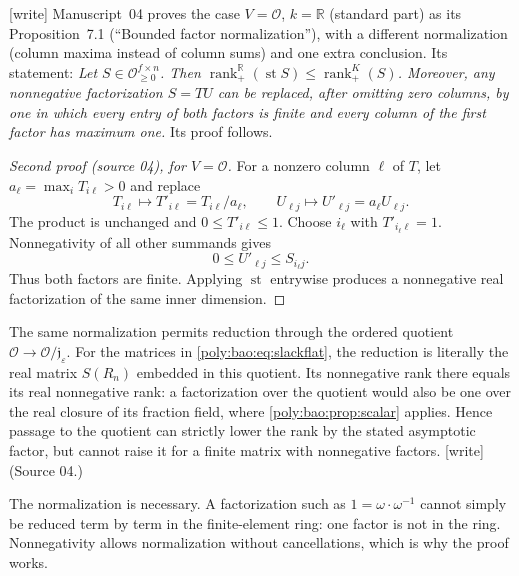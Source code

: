 \documentclass[11pt,a4paper]{article}
\numberwithin{equation}{section}
\theoremstyle{plain}
\newcommand{\wtag}{\textup{[write]}}%
\newcommand{\R}{\mathbb R}
\newcommand{\eps}{\varepsilon}
\newcommand{\st}{\operatorname{st}}
\newcommand{\OO}{\mathcal O}
\newcommand{\nrk}{\operatorname{rank}_{+}}
\newcommand{\JJ}{\mathfrak j}
\begin{document}
\begin{remark}\label{poly:bao:rem:normalization}
\wtag{} Manuscript~04 proves the case $V=\OO$, $k=\R$ (standard part) as
its Proposition~7.1 (``Bounded factor normalization''), with a different
normalization (column maxima instead of column sums) and one extra
conclusion. Its statement: \emph{Let $S\in\OO_{\geq0}^{f\times n}$. Then
$\nrk^{\R}(\st S)\leq\nrk^K(S)$. Moreover, any nonnegative factorization
$S=TU$ can be replaced, after omitting zero columns, by one in which every
entry of both factors is finite and every column of the first factor has
maximum one.} Its proof follows.
\end{remark}
\begin{proof}[Second proof (source 04), for $V=\OO$]
For a nonzero column $\ell$ of $T$, let $a_\ell=\max_iT_{i\ell}>0$ and
replace
\[
 T_{i\ell}\longmapsto T'_{i\ell}=T_{i\ell}/a_\ell,
 \qquad
 U_{\ell j}\longmapsto U'_{\ell j}=a_\ell U_{\ell j}.
\]
The product is unchanged and $0\leq T'_{i\ell}\leq1$. Choose $i_\ell$
with $T'_{i_\ell\ell}=1$. Nonnegativity of all other summands gives
\[
 0\leq U'_{\ell j}\leq S_{i_\ell j}.
\]
Thus both factors are finite. Applying $\st$ entrywise produces a
nonnegative real factorization of the same inner dimension.
\end{proof}

The same normalization permits reduction through the ordered quotient
$\OO\to\OO/\JJ_\eps$. For the matrices in \eqref{poly:bao:eq:slackflat}, the reduction
is literally the real matrix $S(R_n)$ embedded in this quotient. Its
nonnegative rank there equals its real nonnegative rank: a factorization
over the quotient would also be one over the real closure of its fraction
field, where \cref{poly:bao:prop:scalar} applies. Hence passage to the quotient can
strictly lower the rank by the stated asymptotic factor, but cannot raise
it for a finite matrix with nonnegative factors. \wtag{} (Source 04.)

The normalization is necessary. A factorization such as
$1=\omega\cdot\omega^{-1}$ cannot simply be reduced term by term in the
finite-element ring: one factor is not in the ring. Nonnegativity allows
normalization without cancellations, which is why the proof works.
\end{document}
